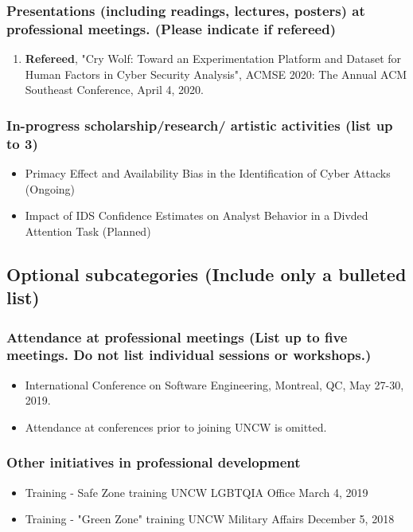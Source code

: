\documentclass[10pt]{article}
\begin{document}
\subsubsection{Presentations (including readings, lectures, posters) at professional meetings. (Please indicate if refereed)}
\begin{enumerate}
    \item \textbf{Refereed}, "Cry Wolf: Toward an Experimentation Platform and Dataset for Human Factors in Cyber Security Analysis", ACMSE 2020: The Annual ACM Southeast Conference, April 4, 2020.
\end{enumerate}

\subsubsection{In-progress scholarship/research/ artistic activities (list up to 3)}
\begin{itemize}
    \item Primacy Effect and Availability Bias in the Identification of Cyber Attacks (Ongoing)
    \item Impact of IDS Confidence Estimates on Analyst Behavior in a Divded Attention Task (Planned)
\end{itemize}

\subsection{Optional subcategories (Include only a bulleted list)}
\subsubsection{Attendance at professional meetings (List up to five meetings. Do not list individual sessions or workshops.)}
\begin{itemize}
    \item International Conference on Software Engineering, Montreal, QC, May 27-30, 2019.
    \item Attendance at conferences prior to joining UNCW is omitted.
\end{itemize}
\subsubsection{Other initiatives in professional development}
\begin{itemize}
    \item Training - Safe Zone training UNCW LGBTQIA Office March 4, 2019
    \item Training - "Green Zone" training UNCW Military Affairs December 5, 2018
\end{itemize}
\end{document}
